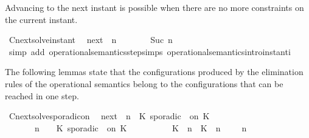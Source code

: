 \begin{isabellebody}
\begin{isamarkuptext}%
Advancing to the next instant is possible when there are no more constraints 
  on the current instant.%
\end{isamarkuptext}\isamarkuptrue%
\isamarkupfalse%
\ Cnext{\isacharunderscore}solve{\isacharunderscore}instant{\isacharcolon}\isanewline
\ \ {\isacartoucheopen}{\isacharparenleft}{\isasymC}\isactrlsub n\isactrlsub e\isactrlsub x\isactrlsub t\ {\isacharparenleft}{\isasymGamma}{\isacharcomma}\ n\ {\isasymturnstile}\ {\isacharbrackleft}{\isacharbrackright}\ {\isasymtriangleright}\ {\isasymPhi}{\isacharparenright}{\isacharparenright}\ {\isasymsupseteq}\ {\isacharbraceleft}\ {\isasymGamma}{\isacharcomma}\ Suc\ n\ {\isasymturnstile}\ {\isasymPhi}\ {\isasymtriangleright}\ {\isacharbrackleft}{\isacharbrackright}\ {\isacharbraceright}{\isacartoucheclose}\isanewline
%
\isadelimproof
%
\endisadelimproof
%
\isatagproof
{}\isamarkupfalse%
\ {\isacharparenleft}simp\ add{\isacharcolon}\ operational{\isacharunderscore}semantics{\isacharunderscore}step{\isachardot}simps\ operational{\isacharunderscore}semantics{\isacharunderscore}intro{\isachardot}instant{\isacharunderscore}i{\isacharparenright}%
\endisatagproof
{\isafoldproof}%
%
\isadelimproof
%
\endisadelimproof
%
\begin{isamarkuptext}%
The following lemmas state that the configurations produced by the elimination 
  rules of the operational semantics belong to the configurations that can be 
  reached in one step.%
\end{isamarkuptext}\isamarkuptrue%
\isamarkupfalse%
\ Cnext{\isacharunderscore}solve{\isacharunderscore}sporadicon{\isacharcolon}\isanewline
\ \ {\isacartoucheopen}{\isacharparenleft}{\isasymC}\isactrlsub n\isactrlsub e\isactrlsub x\isactrlsub t\ {\isacharparenleft}{\isasymGamma}{\isacharcomma}\ n\ {\isasymturnstile}\ {\isacharparenleft}{\isacharparenleft}K\ sporadic\ {\isasymtau}\ on\ K\ {\isacharhash}\ {\isasymPsi}{\isacharparenright}\ {\isasymtriangleright}\ {\isasymPhi}{\isacharparenright}{\isacharparenright}\isanewline
\ \ \ \ {\isasymsupseteq}\ {\isacharbraceleft}\ {\isasymGamma}{\isacharcomma}\ n\ {\isasymturnstile}\ {\isasymPsi}\ {\isasymtriangleright}\ {\isacharparenleft}{\isacharparenleft}K\ sporadic\ {\isasymtau}\ on\ K\ {\isacharhash}\ {\isasymPhi}{\isacharparenright}{\isacharcomma}\isanewline
\ \ \ \ \ \ \ \ {\isacharparenleft}{\isacharparenleft}K\ {\isasymUp}\ n{\isacharparenright}\ {\isacharhash}\ {\isacharparenleft}K\ {\isasymDown}\ n\ {\isacharat}\ {\isasymtau}{\isacharparenright}\ {\isacharhash}\ {\isasymGamma}{\isacharparenright}{\isacharcomma}\ n\ {\isasymturnstile}\ {\isasymPsi}\ {\isasymtriangleright}\ {\isasymPhi}\ {\isacharbraceright}{\isacartoucheclose}\isanewline

\end{isabellebody}
